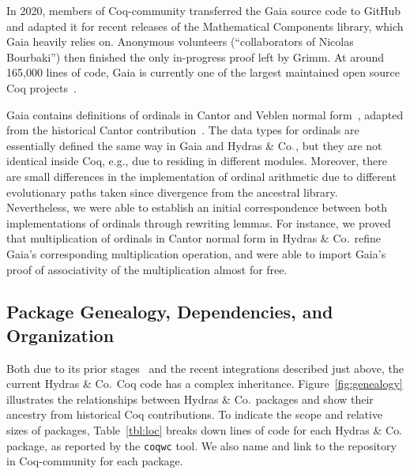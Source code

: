 \documentclass{easychair}
\newcommand{\coq}{Coq\xspace}
\newcommand{\community}{Coq-community\xspace}
\newcommand{\gaia}{Gaia\xspace}
\newcommand{\Hydras}{Hydras \& Co$\text.$\xspace}
\begin{document}
In 2020, members of \community transferred the \gaia source code to GitHub and adapted it for recent releases of the Mathematical Components library, which \gaia heavily relies on. Anonymous volunteers (``collaborators of Nicolas Bourbaki'') then finished the only in-progress proof left by Grimm. At around 165,000 lines of code, \gaia is currently one of the largest maintained open source \coq projects~\cite{Gaia}.

\gaia contains definitions of ordinals in Cantor and Veblen normal form~\cite{grimm:hal-00911710}, adapted from the historical Cantor contribution~\cite{CantorContrib}. The data types for ordinals are essentially defined the same way in Gaia and \Hydras, but they are not identical inside \coq, e.g., due to residing in different modules. Moreover, there are small differences in the implementation of ordinal arithmetic due to different evolutionary paths taken since divergence from the ancestral library.
%
Nevertheless, we were able to establish an initial correspondence between both implementations of ordinals through rewriting lemmas. For instance, we proved that multiplication of ordinals in Cantor normal form in \Hydras refine Gaia's corresponding multiplication operation, and were able to import Gaia's proof of associativity of the multiplication almost for free.

\subsection{Package Genealogy, Dependencies, and Organization}

Both due to its prior stages~\cite{PCiota,JFLA2018paper} and the recent integrations described just above, the current \Hydras Coq code has a complex inheritance. Figure~\ref{fig:genealogy} illustrates the relationships between \Hydras packages and show their ancestry from historical Coq contributions. To indicate the scope and relative sizes of packages, Table~\ref{tbl:loc} breaks down lines of code for each \Hydras package, as reported by the \texttt{coqwc} tool. We also name and link to the repository in \community for each package.
\end{document}
